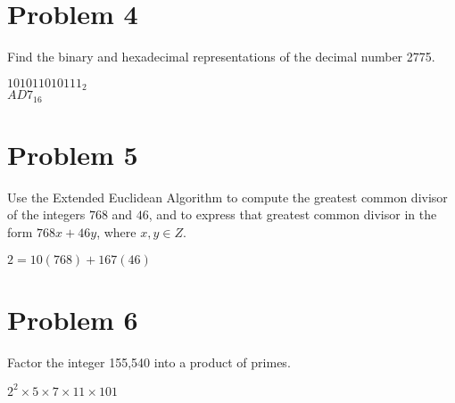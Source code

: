 \documentclass{article}
\newenvironment{problem}[1]{
  \nobreak\section*{Problem #1}
}{}
\begin{document}
  \begin{problem}{4}
    Find the binary and hexadecimal representations of the decimal number 2775.
    \begin{center}
      $101011010111_{2}$\\
      $AD7_{16}$
    \end{center}
  \end{problem}

  \begin{problem}{5}
    Use the Extended Euclidean Algorithm to compute the greatest common divisor of the integers $768$ and $46$, and to express that greatest common divisor in the form $768x + 46y$, where $x, y \in Z$.
    \begin{center}
      $2 = 10(768) + 167(46)$
    \end{center}
  \end{problem}

  \begin{problem}{6}
    Factor the integer 155,540 into a product of primes.
    \begin{center}
      $2^{2} \times 5 \times 7 \times 11 \times 101$
    \end{center}
  \end{problem}
\end{document}
